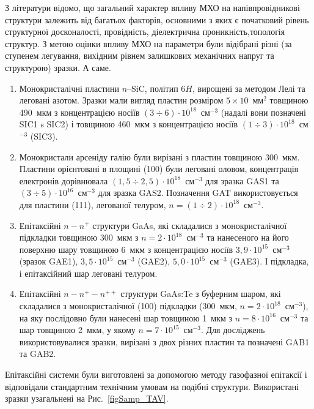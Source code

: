 З літератури \cite{Boltovets,Kr1996,Milenin1994,BelyaevIntac,ASHKINADZE1996,ProcSPIE,Venger1999} відомо,
що загальний характер впливу МХО на напівпровідникові структури залежить від багатьох факторів, основними з яких
є початковий рівень структурної досконалості, провідність, діелектрична проникність,топологія структур.
З метою оцінки впливу МХО на параметри були відібрані різні (за ступенем легування, вихідним рівнем залишкових механічних напруг та структурою) зразки.
А саме.
\begin{enumerate}[label=\asbuk*),leftmargin=0em,itemindent=1.5em]
\item Монокристалічні пластини $n$--SiC, політип 6$H$, вирощені  за методом Лелі та леговані азотом.
Зразки мали вигляд пластин розміром $5\times10$~мм$^2$ товщиною 490~мкм з концентрацією носіїв $(3\div6)\cdot10^{18}$~см$^{-3}$ (надалі вони позначені SIC1 s SIC2)
і товщиною 460~мкм з концентрацією носіїв $(1\div3)\cdot10^{18}$~см$^{-3}$ (SIC3).

\item Монокристали арсеніду галію були вирізані з пластин товщиною 300~мкм.
Пластини орієнтовані в площині (100) були леговані оловом, концентрація електронів дорівнювала $(1,5\div2,5)\cdot10^{18}$~см$^{-3}$ для зразка GAS1
та $(3\div5)\cdot10^{16}$~см$^{-3}$ для зразка GAS2.
Позначення GAT використовується для пластини (111), легованої телуром, $n=(1\div2)\cdot10^{18}$~см$^{-3}$.

\item Епітаксійні $n-n^+$ структури GaAs, які складалися з монокристалічної підкладки товщиною 300~мкм з $n=2\cdot10^{18}$~см$^{-3}$
та нанесеного на його поверхню  шару товщиною 6~мкм з концентрацією носіїв $3,9\cdot10^{15}$~см$^{-3}$ (зразок GAE1),
$3,5\cdot10^{15}$~см$^{-3}$ (GAE2), $5,0\cdot10^{15}$~см$^{-3}$ (GAE3).
І підкладка, і епітаксійний шар леговані телуром.

\item Епітаксійні $n-n^+-n^{++}$ структури GaAs:Te з буферним шаром, які складалися з монокристалічної (100) підкладки (300~мкм, $n=2\cdot10^{18}$~см$^{-3}$),
на яку послідовно були нанесені шар товщиною 1~мкм з $n=8\cdot10^{16}$~см$^{-3}$
та шар товщиною 2~мкм, у якому $n=7\cdot10^{15}$~см$^{-3}$.
Для досліджень використовувалися зразки, вирізані з двох різних пластин та позначені GAB1 та GAB2.
\end{enumerate}
Епітаксійні системи були виготовлені за допомогою методу газофазної епітаксії і відповідали стандартним технічним умовам на подібні структури.
Використані зразки узагальнені на Рис.~\ref{figSamp_TAV}.

